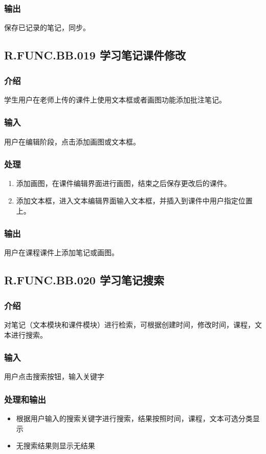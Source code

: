     \subsubsection{输出}
	  保存已记录的笔记，同步。
  \subsection{R.FUNC.BB.019 学习笔记课件修改}
    \subsubsection{介绍}
	   学生用户在老师上传的课件上使用文本框或者画图功能添加批注笔记。
    \subsubsection{输入}
	   用户在编辑阶段，点击添加画图或文本框。
    \subsubsection{处理}
    \begin{enumerate}
      \item 添加画图，在课件编辑界面进行画图，结束之后保存更改后的课件。
      \item 添加文本框，进入文本编辑界面输入文本框，并插入到课件中用户指定位置上。
    \end{enumerate}
    \subsubsection{输出}
	   用户在课程课件上添加笔记或画图。

 \subsection{R.FUNC.BB.020 学习笔记搜索}
    \subsubsection{介绍}
	   对笔记（文本模块和课件模块）进行检索，可根据创建时间，修改时间，课程，文本进行搜索。
    \subsubsection{输入}
	   用户点击搜索按钮，输入关键字
    \subsubsection{处理和输出}
    \begin{itemize}
      \item 根据用户输入的搜索关键字进行搜索，结果按照时间，课程，文本可选分类显示
      \item 无搜索结果则显示无结果
    \end{itemize}


